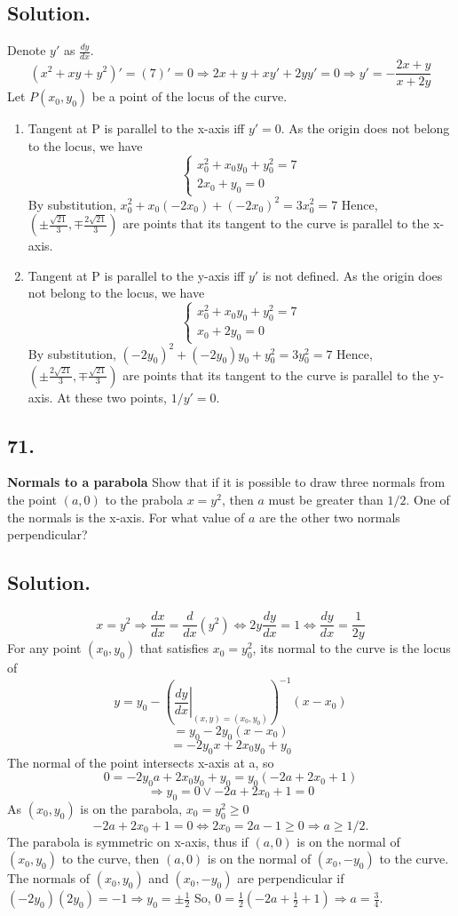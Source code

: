\documentclass{article}
\begin{document}
\subsection*{Solution.}
Denote $y'$ as $\frac{dy}{dx}$.
\[(x^2+xy+y^2)'=(7)'=0\Rightarrow 2x+y+xy'+2yy'=0\Rightarrow y'=-\frac{2x+y}{x+2y}\]
Let $P(x_0,y_0)$ be a point of the locus of the curve.
\begin{enumerate} [label=\textbf{\alph*.}]
    \item 
Tangent at P is parallel to the x-axis iff $y'=0$. 
As the origin does not belong to the locus, we have
\[\left\{\begin{array}{l}x_0^2+x_0y_0+y_0^2=7\\2x_0+y_0=0\end{array}\right.\]
By substitution, $x_0^2+x_0(-2x_0)+(-2x_0)^2=3x_0^2=7$
Hence, $\left(\pm\frac{\sqrt{21}}{3},\mp\frac{2\sqrt{21}}{3}\right)$ are points that its tangent to the curve is parallel to the x-axis.
    \item 
Tangent at P is parallel to the y-axis iff $y'$ is not defined. 
As the origin does not belong to the locus, we have
\[\left\{\begin{array}{l}x_0^2+x_0y_0+y_0^2=7\\x_0+2y_0=0\end{array}\right.\]
By substitution, $(-2y_0)^2+(-2y_0)y_0+y_0^2=3y_0^2=7$
Hence, $\left(\pm\frac{2\sqrt{21}}{3},\mp\frac{\sqrt{21}}{3}\right)$ are points that its tangent to the curve is parallel to the y-axis.
At these two points, $1/y'=0$.
\end{enumerate}
\subsection*{71.}
\textbf{Normals to a parabola  }Show that if it is possible to draw three normals from the point $(a,0)$ to  the prabola $x=y^2$, then $a$ must be greater than $1/2$. One of the normals is the x-axis. For what value of $a$ are the other two normals perpendicular?
\subsection*{Solution.}
\[x=y^2\Rightarrow \frac{dx}{dx}=\frac{d}{dx}(y^2)\Leftrightarrow 2y\frac{dy}{dx}=1\Leftrightarrow \frac{dy}{dx}=\frac{1}{2y}\]
For any point $(x_0,y_0)$ that satisfies $x_0=y_0^2$, its normal to the curve is the locus of 
\[y=y_0-\left(\left.\frac{dy}{dx}\right\vert _{(x,y)=(x_0,y_0)}\right)^{-1}(x-x_0)\]
\[=y_0-2y_0(x-x_0)\]
\[=-2y_0x+2x_0y_0+y_0\]
The normal of the point intersects x-axis at a, so
\[0=-2y_0a+2x_0y_0+y_0=y_0(-2a+2x_0+1)\]
\[\Rightarrow y_0=0\lor -2a+2x_0+1=0\]
As $(x_0,y_0)$ is on the parabola, $x_0=y_0^2\geq 0$
\[-2a+2x_0+1=0\Leftrightarrow 2x_0=2a-1\geq 0 \Rightarrow a\geq 1/2.\]
The parabola is symmetric on x-axis, thus if $(a,0)$ is on the normal of $(x_0,y_0)$ to the curve, then $(a,0)$ is on the normal of $(x_0,-y_0)$ to the curve. \newline
The normals of $(x_0,y_0)$ and $(x_0,-y_0)$ are perpendicular if $(-2y_0)(2y_0)=-1\Rightarrow y_0=\pm \frac{1}{2}$\newline
So, $0=\frac{1}{2}(-2a+\frac{1}{2}+1)\Rightarrow a=\frac{3}{4}.$
\end{document}
